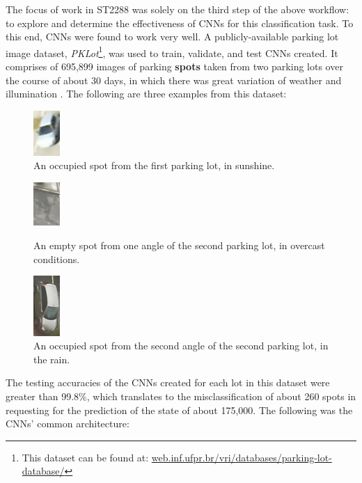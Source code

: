 \documentclass[a4paper, 11pt]{article} %
\begin{document}
	The focus of work in ST2288 was solely on the third step of 
	the above workflow: to 
	explore and determine the effectiveness of CNNs for this classification task. To this end, CNNs were 
	found to work very well. A publicly-available parking lot image dataset, 
	\textit{PKLot}\footnote{This dataset can be found at: 
		\hyperlink{https://web.inf.ufpr.br/vri/databases/parking-lot-database/}
		{web.inf.ufpr.br/vri/databases/parking-lot-database/}}, was used to 
	train, validate, and test CNNs created. It comprises of 695,899 images of 
	parking \textbf{spots} taken from two parking lots over the course of about 
	30 days, in which there was 
	great variation of weather and illumination \cite{pklot-paper}\relax. The 
	following are three examples from this dataset:
	\vskip 5mm
	\begin{figure}[H]
		\centering
		\includegraphics[width=1cm]{figures/pklot_example_1.jpg}
		\caption{An occupied spot from the first parking lot, in sunshine.}
	\end{figure}
	\begin{figure}[H]
		\centering
		\includegraphics[width=1cm]{figures/pklot_example_2.jpg}
		\caption{An empty spot from one angle of the second parking lot, in overcast conditions.}
		\vspace{5mm}
		\includegraphics[width=1cm]{figures/pklot_example_3.jpg}
		\caption{An occupied spot from the second angle of the second parking 
		lot, in the rain.}
	\end{figure}
	\hspace*{-6mm}The testing accuracies of the CNNs created for each lot in this dataset were greater 
	than 99.8\%, which translates to the misclassification of about 260 spots in requesting for the 
	prediction of the state of about 175,000. The following was the CNNs' 
	common architecture:
	\newpage
\end{document}
